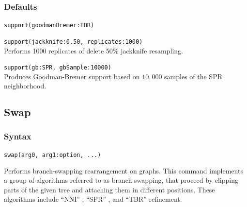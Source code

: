 		\subsubsection{Defaults}
			\texttt{support(goodmanBremer:TBR)}
		

		\begin{example}
			\item{\texttt{support(jackknife:0.50, replicates:1000)}\\Performs 1000 replicates of 
			delete 50\% jackknife resampling.}
				
			\item{\texttt{support(gb:SPR, gbSample:10000)}\\Produces Goodman-Bremer 
			support based on $10,000$ samples of the SPR neighborhood.}
		\end{example}

\subsection{Swap} 
	\subsubsection{Syntax}
		\texttt{swap(arg0, arg1:option, ...)}
			
	\begin{phygdescription}
		{Performs branch-swapping rearrangement on graphs. This command implements a 
		group of algorithms referred to as branch swapping, that proceed by clipping
		parts of the given tree and attaching them in different positions. These algorithms 
		include ``NNI'' \citep{CaminandSokal1965, Robinson1971}, ``SPR'' \citep{Dayhoff1969}, 
		and ``TBR'' \citep{Farris1988, swofford1990a} refinement.}
	\end{phygdescription}
		
